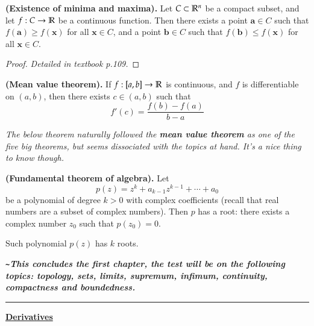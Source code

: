 
\begin{theorem}
  \textbf{(Existence of minima and maxima).} Let $C\subset \mathbb{R}^n$ be a compact subset, and let $f : C\rightarrow \mathbb{R}$ be a continuous function. Then there exists a point $\bm{a}\in C$ such that $f(\bm{a})\geq f(\bm{x})$ for all $\bm{x}\in C$, and a point $\bm{b}\in C$ such that $f(\bm{b})\leq f(\bm{x})$ for all $\bm{x}\in C$.
\end{theorem}
\begin{proof}
  \textit{Detailed in textbook p.109. }
\end{proof}

\begin{theorem}
	  \textbf{(Mean value theorem).} If $f : [a,b] \rightarrow \mathbb{R}$ is continuous, and $f$ is differentiable on $(a,b)$, then there exists $c\in (a,b)$ such that
  \[f'(c)=\frac{f(b)-f(a)}{b-a}\]
\end{theorem}

\emph{The below theorem naturally followed the \textbf{mean value theorem} as one of the five big theorems, but seems dissociated with the topics at hand. It's a nice thing to know though. }

\begin{theorem}
	  \textbf{(Fundamental theorem of algebra).} Let
  \[p(z)=z^k+a_{k-1}z^{k-1}+\cdots + a_0\]
  be a polynomial of degree $k > 0$ with complex coefficients (recall that real numbers are a subset of complex numbers). Then $p$ has a root: there exists a complex number $z_0$ such that $p(z_0)=0$. 
\end{theorem}

\begin{corollary}
	Such polynomial $p(z)$ has $k$ roots. 
\end{corollary}

\textbf{\emph{\texttt{\~}This concludes the first chapter, the test will be on the following topics: topology, sets, limits, supremum, infimum, continuity, compactness and boundedness.}}\\

\hrule

\newpage
\textbf{\ul{Derivatives}} 

